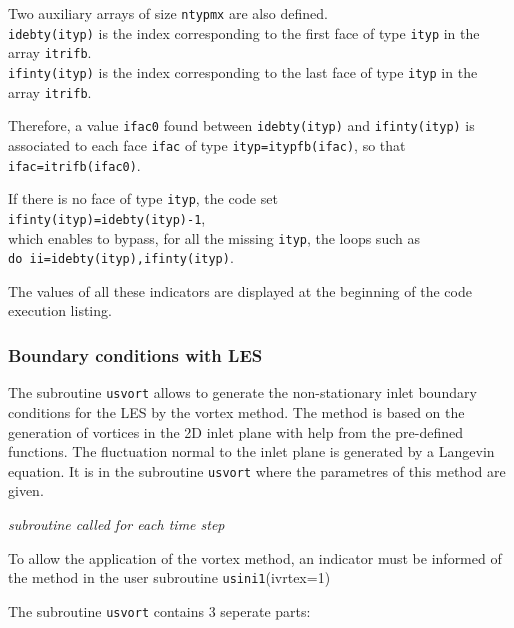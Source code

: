 {{{Two auxiliary arrays of size \texttt{ntypmx} are also defined.\\
\texttt{idebty(ityp)} is the index
corresponding to the first
face of type \texttt{ityp} in the array \texttt{itrifb}.\\
\texttt{ifinty(ityp)} is the index
corresponding to the last
face of type \texttt{ityp} in the array \texttt{itrifb}.

Therefore, a value \texttt{ifac0} found between \texttt{idebty(ityp)} and
\texttt{ifinty(ityp)} is associated to each face \texttt{ifac} of type
\texttt{ityp=itypfb(ifac)}, so that \texttt{ifac=itrifb(ifac0)}.

If there is no face of type \texttt{ityp}, the code set \\
\texttt{ifinty(ityp)=idebty(ityp)-1},\\
which enables to bypass, for all the missing \texttt{ityp}, the loops such as \\
\texttt{do ii=idebty(ityp),ifinty(ityp)}.

The values of all these indicators are displayed at the beginning of the
code execution listing.

\subsubsection[Boundary conditions with LES]
{Boundary conditions with LES}
\label{prg_usvort}%
The subroutine \texttt{usvort} allows to generate the non-stationary inlet boundary
conditions for the LES by the vortex method. The method is based on
 the generation of vortices in the 2D inlet plane with help from
the pre-defined functions. The fluctuation normal to the inlet plane
is generated by a Langevin equation. It is in the subroutine \texttt{usvort}
 where the parametres of this method are given.

\noindent
\textit{subroutine called for each time step}

To allow the application of the vortex method, an indicator must be informed of
the method in the user subroutine \texttt{usini1}(ivrtex=1)

The subroutine \texttt{usvort} contains 3 seperate parts:

}}}
